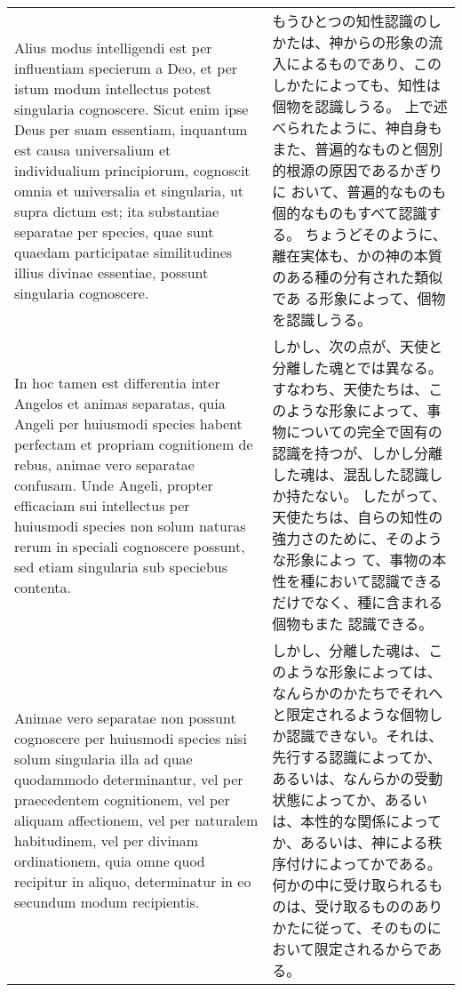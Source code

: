 \documentclass[10pt]{jsarticle} %
\begin{document}
\begin{longtable}{p{21em}p{21em}}
\\




Alius modus
 intelligendi est per influentiam specierum a Deo, et per istum modum
 intellectus potest singularia cognoscere. Sicut enim ipse Deus per suam
 essentiam, inquantum est causa universalium et individualium
 principiorum, cognoscit omnia et universalia et singularia, ut supra
 dictum est; ita substantiae separatae per species, quae sunt quaedam
 participatae similitudines illius divinae essentiae, possunt singularia
 cognoscere.


&

もうひとつの知性認識のしかたは、神からの形象の流入によるものであり、この
 しかたによっても、知性は個物を認識しうる。
上で述べられたように、神自身もまた、普遍的なものと個別的根源の原因であるかぎりに
 おいて、普遍的なものも個的なものもすべて認識する。
ちょうどそのように、離在実体も、かの神の本質のある種の分有された類似であ
 る形象によって、個物を認識しうる。

\\


 In hoc tamen est differentia inter Angelos et animas
 separatas, quia Angeli per huiusmodi species habent perfectam et
 propriam cognitionem de rebus, animae vero separatae confusam. Unde
 Angeli, propter efficaciam sui intellectus per huiusmodi species non
 solum naturas rerum in speciali cognoscere possunt, sed etiam
 singularia sub speciebus contenta. 


&

しかし、次の点が、天使と分離した魂とでは異なる。
すなわち、天使たちは、このような形象によって、事物についての完全で固有の
 認識を持つが、しかし分離した魂は、混乱した認識しか持たない。
したがって、天使たちは、自らの知性の強力さのために、そのような形象によっ
 て、事物の本性を種において認識できるだけでなく、種に含まれる個物もまた
 認識できる。

\\

Animae vero separatae non possunt
 cognoscere per huiusmodi species nisi solum singularia illa ad quae
 quodammodo determinantur, vel per praecedentem cognitionem, vel per
 aliquam affectionem, vel per naturalem habitudinem, vel per divinam
 ordinationem, quia omne quod recipitur in aliquo, determinatur in eo
 secundum modum recipientis.

&

しかし、分離した魂は、このような形象によっては、なんらかのかたちでそれへ
 と限定されるような個物しか認識できない。それは、先行する認識によってか、
 あるいは、なんらかの受動状態によってか、あるいは、本性的な関係によって
 か、あるいは、神による秩序付けによってかである。
何かの中に受け取られるものは、受け取るもののありかたに従って、そのものに
 おいて限定されるからである。


\end{longtable}
\end{document}
